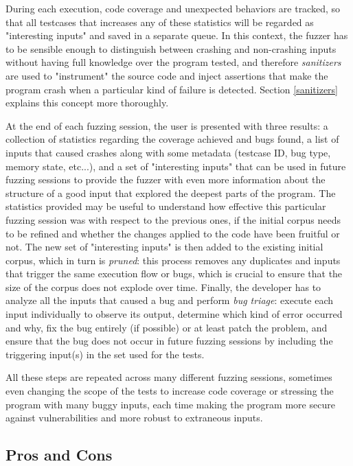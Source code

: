 During each execution, code coverage and unexpected behaviors are tracked, so that all testcases that increases any of these statistics will be regarded as "interesting inputs" and saved in a separate queue. In this context, the fuzzer has to be sensible enough to distinguish between crashing and non-crashing inputs without having full knowledge over the program tested, and therefore \textit{sanitizers} are used to "instrument" the source code and inject assertions that make the program crash when a particular kind of failure is detected. Section \ref{sanitizers} explains this concept more thoroughly.

At the end of each fuzzing session, the user is presented with three results: a collection of statistics regarding the coverage achieved and bugs found, a list of inputs that caused crashes along with some metadata (testcase ID, bug type, memory state, etc...), and a set of "interesting inputs" that can be used in future fuzzing sessions to provide the fuzzer with even more information about the structure of a good input that explored the deepest parts of the program. 
The statistics provided may be useful to understand how effective this particular fuzzing session was with respect to the previous ones, if the initial corpus needs to be refined and whether the changes applied to the code have been fruitful or not.
The new set of "interesting inputs" is then added to the existing initial corpus, which in turn is \textit{pruned}: this process removes any duplicates and inputs that trigger the same execution flow or bugs, which is crucial to ensure that the size of the corpus does not explode over time.
Finally, the developer has to analyze all the inputs that caused a bug and perform \textit{bug triage}: execute each input individually to observe its output, determine which kind of error occurred and why, fix the bug entirely (if possible) or at least patch the problem, and ensure that the bug does not occur in future fuzzing sessions by including the triggering input(s) in the set used for the tests.

All these steps are repeated across many different fuzzing sessions, sometimes even changing the scope of the tests to increase code coverage or stressing the program with many buggy inputs, each time making the program more secure against vulnerabilities and more robust to extraneous inputs. 


\subsection{Pros and Cons}

